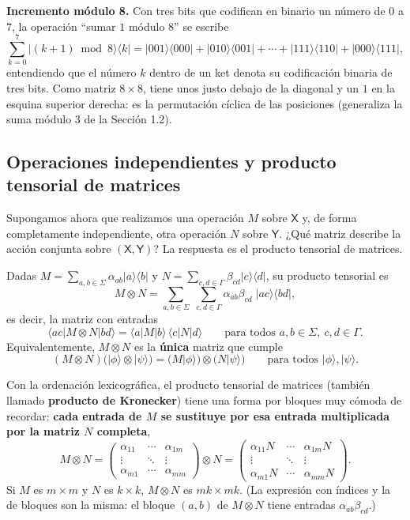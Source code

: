 \documentclass[11pt, a4paper, twoside, openright]{report}
\begin{document}
\noindent \textbf{Incremento módulo 8.} Con tres bits que codifican en binario un número de $0$ a $7$, la operación ``sumar $1$ módulo $8$'' se escribe
\[ \sum_{k=0}^{7} |(k+1) \bmod 8\rangle\langle k| = |001\rangle\langle000| + |010\rangle\langle001| + \cdots + |111\rangle\langle110| + |000\rangle\langle111|, \]
entendiendo que el número $k$ dentro de un ket denota su codificación binaria de tres bits. Como matriz $8\times 8$, tiene unos justo debajo de la diagonal y un $1$ en la esquina superior derecha: es la permutación cíclica de las posiciones (generaliza la suma módulo $3$ de la Sección 1.2).

\subsection{Operaciones independientes y producto tensorial de matrices}

\noindent Supongamos ahora que realizamos una operación $M$ sobre $\mathsf{X}$ y, de forma completamente independiente, otra operación $N$ sobre $\mathsf{Y}$. ¿Qué matriz describe la acción conjunta sobre $(\mathsf{X},\mathsf{Y})$? La respuesta es el producto tensorial de matrices.

\begin{tcolorbox}[colback=teal!5!white,colframe=teal!75!black,title=\textbf{Definición: Producto tensorial de matrices}]
Dadas $M = \sum_{a,b\in\Sigma}\alpha_{ab}|a\rangle\langle b|$ y $N = \sum_{c,d\in\Gamma}\beta_{cd}|c\rangle\langle d|$, su producto tensorial es
\[ M\otimes N = \sum_{a,b\in\Sigma}\;\sum_{c,d\in\Gamma} \alpha_{ab}\beta_{cd}\;|ac\rangle\langle bd|, \]
es decir, la matriz con entradas
\[ \langle ac|M\otimes N|bd\rangle = \langle a|M|b\rangle\,\langle c|N|d\rangle \qquad \text{para todos } a,b\in\Sigma,\ c,d\in\Gamma. \]
Equivalentemente, $M\otimes N$ es la \textbf{única} matriz que cumple
\[ (M\otimes N)\big(|\phi\rangle\otimes|\psi\rangle\big) = \big(M|\phi\rangle\big)\otimes\big(N|\psi\rangle\big) \qquad \text{para todos } |\phi\rangle, |\psi\rangle. \]
\end{tcolorbox}

\noindent Con la ordenación lexicográfica, el producto tensorial de matrices (también llamado \textbf{producto de Kronecker}) tiene una forma por bloques muy cómoda de recordar: \textbf{cada entrada de $M$ se sustituye por esa entrada multiplicada por la matriz $N$ completa},
\[
M\otimes N = \begin{pmatrix} \alpha_{11} & \cdots & \alpha_{1m} \\ \vdots & \ddots & \vdots \\ \alpha_{m1} & \cdots & \alpha_{mm}\end{pmatrix} \otimes N
= \begin{pmatrix} \alpha_{11}N & \cdots & \alpha_{1m}N \\ \vdots & \ddots & \vdots \\ \alpha_{m1}N & \cdots & \alpha_{mm}N\end{pmatrix}.
\]
Si $M$ es $m\times m$ y $N$ es $k\times k$, $M\otimes N$ es $mk\times mk$. (La expresión con índices y la de bloques son la misma: el bloque $(a,b)$ de $M\otimes N$ tiene entradas $\alpha_{ab}\beta_{cd}$.)
\end{document}
